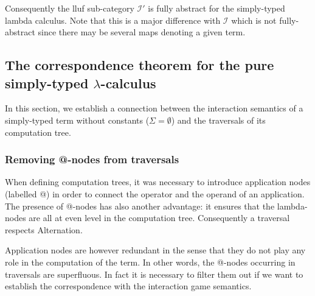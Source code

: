 Consequently the lluf sub-category $\mathcal{I'}$ is fully abstract for the simply-typed lambda calculus.
Note that this is a major difference with $\mathcal{I}$ which is not fully-abstract since there may be several maps denoting a given
term.





\subsection{The correspondence theorem for the pure simply-typed $\lambda$-calculus}
In this section, we establish a
connection between the interaction semantics of a simply-typed term without constants ($\Sigma = \emptyset$)
and the traversals of its computation tree.

\subsubsection{Removing @-nodes from traversals}

When defining computation trees, it was necessary to introduce
application nodes (labelled @) in order to connect the operator and
the operand of an application. The presence of @-nodes has also
another advantage: it ensures that the lambda-nodes are all at even
level in the computation tree. Consequently a traversal respects
Alternation.

Application nodes are however redundant in the sense that they do
not play any role in the computation of the term. In other words,
the @-nodes occurring in traversals are superfluous. In fact it is
necessary to filter them out if we want to establish the
correspondence with the interaction game semantics.

